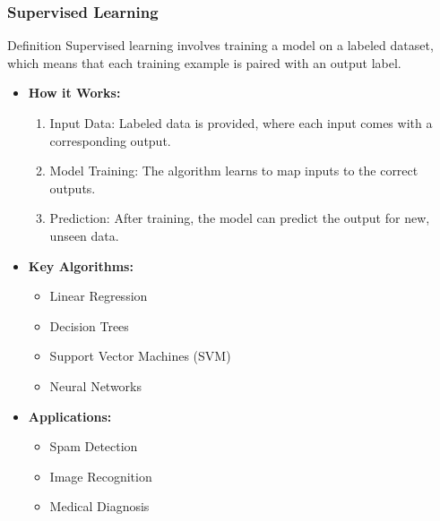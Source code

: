 \documentclass[aspectratio=169]{beamer}
\begin{document}
\begin{frame}[fragile]
    \frametitle{Supervised Learning}
    \begin{block}{Definition}
        Supervised learning involves training a model on a labeled dataset, which means that each training example is paired with an output label.
    \end{block}
    
    \begin{itemize}
        \item \textbf{How it Works:}
        \begin{enumerate}
            \item Input Data: Labeled data is provided, where each input comes with a corresponding output.
            \item Model Training: The algorithm learns to map inputs to the correct outputs.
            \item Prediction: After training, the model can predict the output for new, unseen data.
        \end{enumerate}
        
        \item \textbf{Key Algorithms:}
        \begin{itemize}
            \item Linear Regression
            \item Decision Trees
            \item Support Vector Machines (SVM)
            \item Neural Networks
        \end{itemize}
        
        \item \textbf{Applications:}
        \begin{itemize}
            \item Spam Detection
            \item Image Recognition
            \item Medical Diagnosis
        \end{itemize}
    \end{itemize}
\end{frame}
\end{document}
